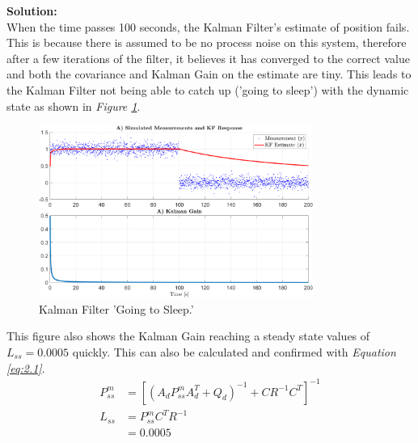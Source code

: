 \documentclass[10pt]{article}
\newcommand{\solution}{\textbf{Solution: \\}}
\begin{document}
\begin{enumerate}[label=\textbf{\arabic*.}]
  \solution
  When the time passes 100 seconds, the Kalman Filter's estimate of position 
  fails. This is because there is assumed to be no process noise on this 
  system, therefore after a few iterations of the filter, it believes it has 
  converged to the correct value and both the covariance and Kalman Gain on the 
  estimate are tiny. This leads to the Kalman Filter not being able to catch up 
  ('going to sleep') with the dynamic state as shown in \emph{Figure \ref{f:2.1}}.
  \begin{figure}[H]
    \centering
    \includegraphics[width=0.8\textwidth]{p2_a.png}
    \caption{Kalman Filter 'Going to Sleep.'}
    \label{f:2.1}
  \end{figure}
  This figure also shows the Kalman Gain reaching a steady state values of 
  $L_{ss}=0.0005$ quickly. This can also be calculated and confirmed with 
  \emph{Equation \ref{eq:2.1}}.
  \begin{equation}
    \begin{split}
      P^{m}_{ss} &= \left[\left(A_d P^{m}_{ss} A_d^T + Q_d\right)^{-1} 
                + C R^{-1} C^T\right]^{-1} \\
      L_{ss} &= P^{m}_{ss}C^T R^{-1} \\
             &= 0.0005
    \end{split}
    \label{eq:2.1}
  \end{equation}


\end{enumerate}
\end{document}
